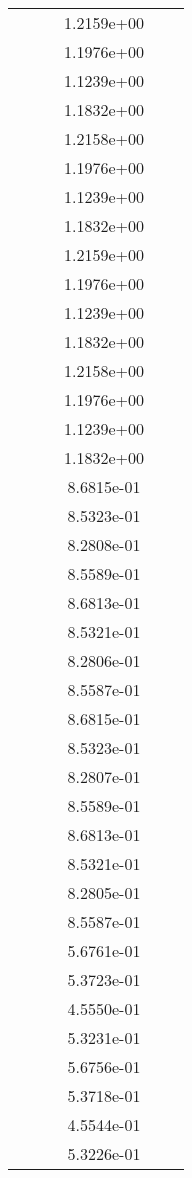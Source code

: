 \begin{xltabular}{\textwidth}{r|rS[table-format=1.3e+2]S[table-format=1.4e+2]S[table-format=1.4e+2]S[table-format=-1.5]}
&  &  & 1.2159e+00 & & \\
&  &  & 1.1976e+00 & & \\
&  &  & 1.1239e+00 & & \\
&  &  & 1.1832e+00 & & \\
&  &  & 1.2158e+00 & & \\
&  &  & 1.1976e+00 & & \\
&  &  & 1.1239e+00 & & \\
&  &  & 1.1832e+00 & & \\
&  &  & 1.2159e+00 & & \\
&  &  & 1.1976e+00 & & \\
&  &  & 1.1239e+00 & & \\
&  &  & 1.1832e+00 & & \\
&  &  & 1.2158e+00 & & \\
&  &  & 1.1976e+00 & & \\
&  &  & 1.1239e+00 & & \\
&  &  & 1.1832e+00 & & \\
&  &  & 8.6815e-01 & & \\
&  &  & 8.5323e-01 & & \\
&  &  & 8.2808e-01 & & \\
&  &  & 8.5589e-01 & & \\
&  &  & 8.6813e-01 & & \\
&  &  & 8.5321e-01 & & \\
&  &  & 8.2806e-01 & & \\
&  &  & 8.5587e-01 & & \\
&  &  & 8.6815e-01 & & \\
&  &  & 8.5323e-01 & & \\
&  &  & 8.2807e-01 & & \\
&  &  & 8.5589e-01 & & \\
&  &  & 8.6813e-01 & & \\
&  &  & 8.5321e-01 & & \\
&  &  & 8.2805e-01 & & \\
&  &  & 8.5587e-01 & & \\
&  &  & 5.6761e-01 & & \\
&  &  & 5.3723e-01 & & \\
&  &  & 4.5550e-01 & & \\
&  &  & 5.3231e-01 & & \\
&  &  & 5.6756e-01 & & \\
&  &  & 5.3718e-01 & & \\
&  &  & 4.5544e-01 & & \\
&  &  & 5.3226e-01 & & \\

\end{xltabular}
